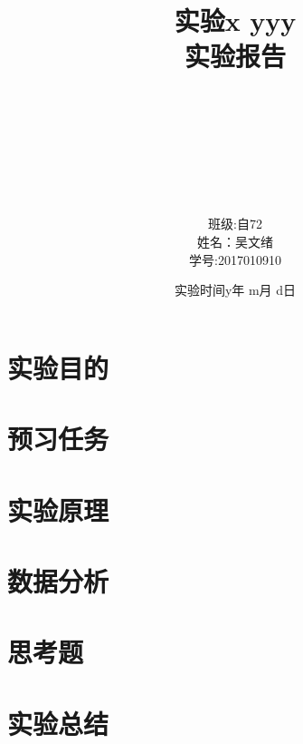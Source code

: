 \documentclass[a4paper, 11pt]{article} %
\title{\huge{\textbf{实验x yyy} \\ \textbf{实验报告}}}
\author{
    \\
    \\
    \\
    \\
    \\
    \\
    \begin{tabular}{ll}
        班级: & 自72\\
        姓名：& 吴文绪\\
        学号: &2017010910\\
    \end{tabular}
}
\date{实验时间\quad y年 m月 d日}
\begin{document}
\maketitle
\thispagestyle{empty}
\setcounter{page}{0}
\newpage


\section{实验目的}


\section{预习任务}


\section{实验原理}


\section{数据分析}


\section{思考题}

\section{实验总结}




\end{document}
